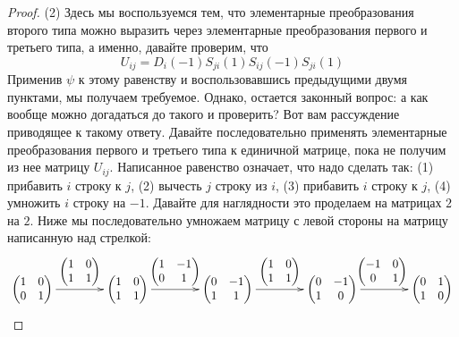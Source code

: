 \begin{proof}
(2) Здесь мы воспользуемся тем, что элементарные преобразования второго типа можно выразить через элементарные преобразования первого и третьего типа, а именно, давайте проверим, что 
\[
U_{ij} = D_i(-1)S_{ji}(1)S_{ij}(-1)S_{ji}(1)
\]
Применив $\psi$ к этому равенству и воспользовавшись предыдущими двумя пунктами, мы получаем требуемое.
Однако, остается законный вопрос: а как вообще можно догадаться до такого и проверить?
Вот вам рассуждение приводящее к такому ответу.
Давайте последовательно применять элементарные преобразования первого и третьего типа к единичной матрице, пока не получим из нее матрицу $U_{ij}$.
Написанное равенство означает, что надо сделать так: (1) прибавить $i$ строку к $j$, (2) вычесть $j$ строку из $i$, (3) прибавить $i$ строку к $j$, (4) умножить $i$ строку на $-1$.
Давайте для наглядности это проделаем на матрицах $2$ на $2$.
Ниже мы последовательно умножаем матрицу с левой стороны на матрицу написанную над стрелкой:
\[
\xymatrix@R=10pt@C=40pt{
 	{
 	\begin{pmatrix}
	{1}&{0}\\
	{0}&{1}\\
	\end{pmatrix}
	}\ar[r]^-{
	\begin{pmatrix}
	{1}&{0}\\{1}&{1}\\
	\end{pmatrix}
	}&{
 	\begin{pmatrix}
	{1}&{0}\\
	{1}&{1}\\
	\end{pmatrix}
	}\ar[r]^-{
 	\begin{pmatrix}
	{1}&{-1}\\
	{0}&{1}\\
	\end{pmatrix}
	}&{
 	\begin{pmatrix}
	{0}&{-1}\\
	{1}&{1}\\
	\end{pmatrix}
	}\ar[r]^{
 	\begin{pmatrix}
	{1}&{0}\\
	{1}&{1}\\
	\end{pmatrix}
	}&{
 	\begin{pmatrix}
	{0}&{-1}\\
	{1}&{0}\\
	\end{pmatrix}
	}\ar[r]^{
 	\begin{pmatrix}
	{-1}&{0}\\
	{0}&{1}\\
	\end{pmatrix}
	}&{
 	\begin{pmatrix}
	{0}&{1}\\
	{1}&{0}\\
	\end{pmatrix}
	}
}
\]
\end{proof}


